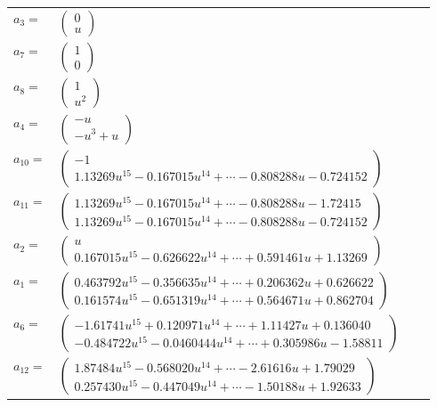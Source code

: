 \documentclass[1p]{elsarticle_modified}
\theoremstyle{definition}
\begin{document}
\begin{tabular}{m{7pt} m{180pt} m{7pt} m{180pt} }
\flushright $a_{3}=$&$\begin{pmatrix}0\\u\end{pmatrix}$ \\
\flushright $a_{7}=$&$\begin{pmatrix}1\\0\end{pmatrix}$ \\
\flushright $a_{8}=$&$\begin{pmatrix}1\\u^2\end{pmatrix}$ \\
\flushright $a_{4}=$&$\begin{pmatrix}- u\\- u^3+u\end{pmatrix}$ \\
\flushright $a_{10}=$&$\begin{pmatrix}-1\\1.13269 u^{15}-0.167015 u^{14}+\cdots-0.808288 u-0.724152\end{pmatrix}$ \\
\flushright $a_{11}=$&$\begin{pmatrix}1.13269 u^{15}-0.167015 u^{14}+\cdots-0.808288 u-1.72415\\1.13269 u^{15}-0.167015 u^{14}+\cdots-0.808288 u-0.724152\end{pmatrix}$ \\
\flushright $a_{2}=$&$\begin{pmatrix}u\\0.167015 u^{15}-0.626622 u^{14}+\cdots+0.591461 u+1.13269\end{pmatrix}$ \\
\flushright $a_{1}=$&$\begin{pmatrix}0.463792 u^{15}-0.356635 u^{14}+\cdots+0.206362 u+0.626622\\0.161574 u^{15}-0.651319 u^{14}+\cdots+0.564671 u+0.862704\end{pmatrix}$ \\
\flushright $a_{6}=$&$\begin{pmatrix}-1.61741 u^{15}+0.120971 u^{14}+\cdots+1.11427 u+0.136040\\-0.484722 u^{15}-0.0460444 u^{14}+\cdots+0.305986 u-1.58811\end{pmatrix}$ \\
\flushright $a_{12}=$&$\begin{pmatrix}1.87484 u^{15}-0.568020 u^{14}+\cdots-2.61616 u+1.79029\\0.257430 u^{15}-0.447049 u^{14}+\cdots-1.50188 u+1.92633\end{pmatrix}$ \\

\end{tabular}
\end{document}
